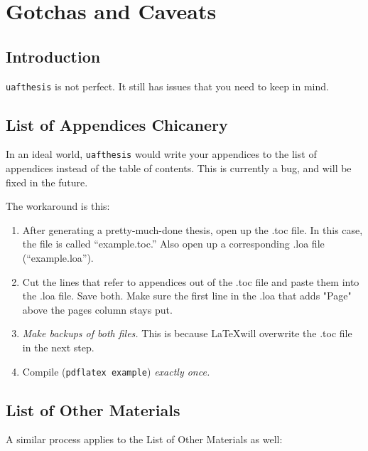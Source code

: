 \chapter{Gotchas and Caveats}

\section{Introduction}

\texttt{uafthesis} is not perfect. It still has issues that you need to keep
in mind.

\section{List of Appendices Chicanery}

In an ideal world, \texttt{uafthesis} would write your appendices to the
list of appendices instead of the table of contents. This is currently a bug,
and will be fixed in the future.

The workaround is this:

\begin{enumerate}
\item After generating a pretty-much-done thesis, open up the .toc file. In
this case, the file is called ``example.toc.'' Also open up a corresponding
.loa file (``example.loa'').
\item Cut the lines that refer to appendices out of the .toc file and paste
them into the .loa file. Save both. Make sure the first line in the .loa
that adds "Page" above the pages column stays put.
\item \emph{Make backups of both files.} This is because \LaTeX will overwrite
the .toc file in the next step.
\item Compile (\texttt{pdflatex example}) \emph{exactly once.}
\end{enumerate}

\section{List of Other Materials}

A similar process applies to the List of Other Materials as well:

